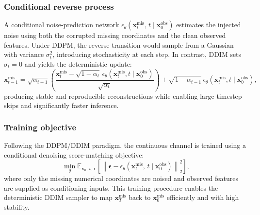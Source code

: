 \documentclass[times, review, 10pt]{elsarticle}
\begin{document}
\subsubsection{Conditional reverse process}
A conditional noise-prediction network
$
\epsilon_\theta(\mathbf{x}_t^{\mathrm{mis}},\, t \mid \mathbf{x}_0^{\mathrm{obs}})
$
estimates the injected noise using both the corrupted missing coordinates and
the clean observed features. Under DDPM, the reverse transition would sample
from a Gaussian with variance $\sigma_t^2$, introducing stochasticity at each
step. In contrast, DDIM sets $\sigma_t=0$ and yields the deterministic update:
\begin{equation}
\mathbf{x}_{t-1}^{\mathrm{mis}}
=
\sqrt{\alpha_{t-1}}
\!\left(
\frac{\mathbf{x}_t^{\mathrm{mis}}
      - \sqrt{1-\alpha_t}\,
        \epsilon_\theta(\mathbf{x}_t^{\mathrm{mis}},t \mid \mathbf{x}_0^{\mathrm{obs}})}
     {\sqrt{\alpha_t}}
\right)
+
\sqrt{1-\alpha_{t-1}}\,
\epsilon_\theta(\mathbf{x}_t^{\mathrm{mis}},t\mid\mathbf{x}_0^{\mathrm{obs}}),
\end{equation}
producing stable and reproducible reconstructions while enabling large
timestep skips and significantly faster inference.

\subsubsection{Training objective}
Following the DDPM/DDIM paradigm, the continuous channel is trained using a
conditional denoising score-matching objective:
\begin{equation}
\min_\theta
\mathbb{E}_{\mathbf{x}_0,\, t,\, \boldsymbol{\epsilon}}
\left[
\left\|
\boldsymbol{\epsilon}
-
\epsilon_\theta(\mathbf{x}_t^{\mathrm{mis}},\, t \mid \mathbf{x}_0^{\mathrm{obs}})
\right\|_2^2
\right],
\end{equation}
where only the missing numerical coordinates are noised and observed features
are supplied as conditioning inputs. This training procedure enables the
deterministic DDIM sampler to map $\mathbf{x}_T^{\mathrm{mis}}$ back to
$\mathbf{x}_0^{\mathrm{mis}}$ efficiently and with high stability.

\end{document}
